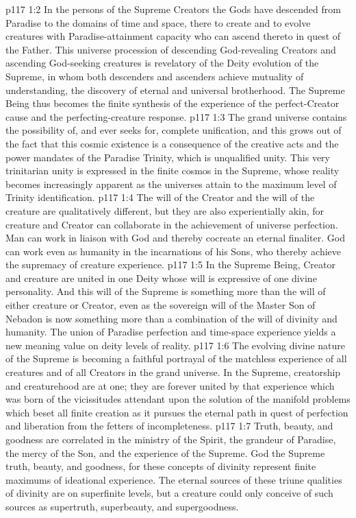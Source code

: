 \vs p117 1:2 \pc In the persons of the Supreme Creators the Gods have descended from Paradise to the domains of time and space, there to create and to evolve creatures with Paradise\hyp{}attainment capacity who can ascend thereto in quest of the Father. This universe procession of descending God\hyp{}revealing Creators and ascending God\hyp{}seeking creatures is revelatory of the Deity evolution of the Supreme, in whom both descenders and ascenders achieve mutuality of understanding, the discovery of eternal and universal brotherhood. The Supreme Being thus becomes the finite synthesis of the experience of the perfect\hyp{}Creator cause and the perfecting\hyp{}creature response.
\vs p117 1:3 The grand universe contains the possibility of, and ever seeks for, complete unification, and this grows out of the fact that this cosmic existence is a consequence of the creative acts and the power mandates of the Paradise Trinity, which is unqualified unity. This very trinitarian unity is expressed in the finite cosmos in the Supreme, whose reality becomes increasingly apparent as the universes attain to the maximum level of Trinity identification.
\vs p117 1:4 \pc The will of the Creator and the will of the creature are qualitatively different, but they are also experientially akin, for creature and Creator can collaborate in the achievement of universe perfection. Man can work in liaison with God and thereby cocreate an eternal finaliter. God can work even as humanity in the incarnations of his Sons, who thereby achieve the supremacy of creature experience.
\vs p117 1:5 In the Supreme Being, Creator and creature are united in one Deity whose will is expressive of one divine personality. And this will of the Supreme is something more than the will of either creature or Creator, even as the sovereign will of the Master Son of Nebadon is now something more than a combination of the will of divinity and humanity. The union of Paradise perfection and time\hyp{}space experience yields a new meaning value on deity levels of reality.
\vs p117 1:6 The evolving divine nature of the Supreme is becoming a faithful portrayal of the matchless experience of all creatures and of all Creators in the grand universe. In the Supreme, creatorship and creaturehood are at one; they are forever united by that experience which was born of the vicissitudes attendant upon the solution of the manifold problems which beset all finite creation as it pursues the eternal path in quest of perfection and liberation from the fetters of incompleteness.
\vs p117 1:7 \pc Truth, beauty, and goodness are correlated in the ministry of the Spirit, the grandeur of Paradise, the mercy of the Son, and the experience of the Supreme. God the Supreme  truth, beauty, and goodness, for these concepts of divinity represent finite maximums of ideational experience. The eternal sources of these triune qualities of divinity are on superfinite levels, but a creature could only conceive of such sources as supertruth, superbeauty, and supergoodness.

